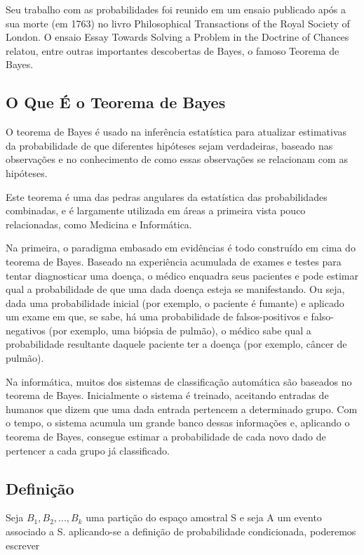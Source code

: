 \documentclass[a4paper,12pt]{report}
\begin{document}
{Seu trabalho com as probabilidades foi reunido em um ensaio
publicado após a sua morte (em 1763) no livro Philosophical
Transactions of the Royal Society of London. O ensaio Essay
Towards Solving a Problem in the Doctrine of Chances relatou,
entre outras importantes descobertas de Bayes, o famoso Teorema de
Bayes.

\subsection{ O Que É o Teorema de Bayes}

O teorema de Bayes é usado na inferência estatística para
atualizar estimativas da probabilidade de que diferentes hipóteses
sejam verdadeiras, baseado nas observações e no conhecimento de
como essas observações se relacionam com as hipóteses.\vskip0.3cm

Este teorema é uma das pedras angulares da estatística das
probabilidades combinadas, e é largamente utilizada em áreas a
primeira vista pouco relacionadas, como Medicina e
Informática.\vskip0.3cm

Na primeira, o paradigma embasado em evidências é todo construído
em cima do teorema de Bayes. Baseado na experiência acumulada de
exames e testes para tentar diagnosticar uma doença, o médico
enquadra seus pacientes e pode estimar qual a probabilidade de que
uma dada doença esteja se manifestando. Ou seja, dada uma
probabilidade inicial (por exemplo, o paciente é fumante) e
aplicado um exame em que, se sabe, há uma probabilidade de
falsos-positivos e falso-negativos (por exemplo, uma biópsia de
pulmão), o médico sabe qual a probabilidade resultante daquele
paciente ter a doença (por exemplo, câncer de pulmão).\vskip0.3cm

Na informática, muitos dos sistemas de classificação automática
são baseados no teorema de Bayes. Inicialmente o sistema é
treinado, aceitando entradas de humanos que dizem que uma dada
entrada pertencem a determinado grupo. Com o tempo, o sistema
acumula um grande banco dessas informações e, aplicando o teorema
de Bayes, consegue estimar a probabilidade de cada novo dado de
pertencer a cada grupo já classificado.\vskip0.3cm


\subsection{Definição}

Seja $B_{1},B_{2},...,B_{k}$ uma partição do espaço amostral S e
seja A um evento associado a S. aplicando-se a definição de
probabilidade condicionada, poderemos escrever


}
\end{document}
